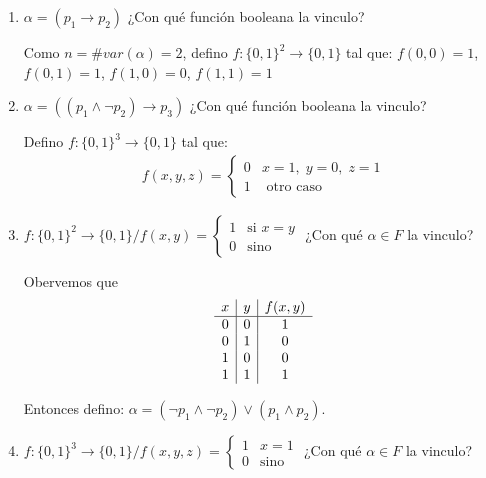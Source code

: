 \begin{enumerate}
    \item $\alpha = (p_1 \to p_2)$ ¿Con qué función booleana la vinculo?

        Como $n = \# var(\alpha) = 2$, defino $f: {\{ 0,1 \}}^{2} \to 
        \{ 0,1 \}$ tal que:
            $f(0,0) = 1$,
            $f(0,1) = 1$,
            $f(1,0) = 0$,
            $f(1,1) = 1$

    \item $\alpha = ((p_1 \wedge \neg p_2) \to p_3)$ 
        ¿Con qué función booleana la vinculo?

        Defino $f: {\{ 0,1 \}}^3 \to \{ 0,1 \}$ tal que:
       \begin{gather*}
            f(x,y,z) = \begin{cases}
                0 & x = 1, \; y=0, \; z=1 \\
                1 & \text{ otro caso}
            \end{cases} 
        \end{gather*} 

    \item $f: {\{ 0,1 \}}^2 \to \{ 0,1 \} / f(x,y) = \begin{cases} 
            1 & \text{si } x=y \\
            0 & \text{sino}
            \end{cases}$
        ¿Con qué $\alpha \in F$ la vinculo?

        Obervemos que
        \begin{gather*}
            \begin{array}{c | c | c}
                x & y & f(x,y) \\
                \hline 
                0 & 0 & 1 \\
                0 & 1 & 0 \\
                1 & 0 & 0 \\
                1 & 1 & 1
            \end{array}
        \end{gather*}

        Entonces defino:
        $\alpha = (\neg p_1 \wedge \neg p_2) \vee (p_1 \wedge p_2)$.

    \item $f: {\{ 0,1 \}}^3 \to \{ 0,1 \} / f(x,y,z) = \begin{cases}
            1 & x = 1 \\ 0 & \text{sino} \end{cases}$
        ¿Con qué $\alpha \in F$ la vinculo?


\end{enumerate}
